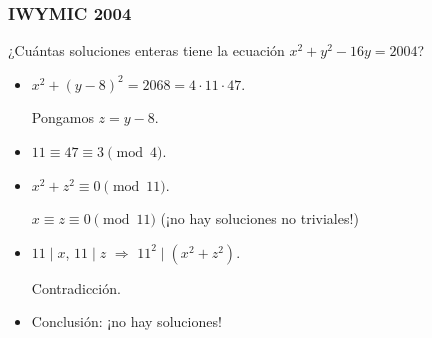 \documentclass[handout]{beamer}
\begin{document}

\begin{frame}[fragile]
  \frametitle{IWYMIC 2004}

  \begin{shaded}
    ¿Cuántas soluciones enteras tiene la ecuación $x^2 + y^2 - 16y = 2004$?
  \end{shaded}

  \vspace{\fill}

  \ifdefined\solutions

  \begin{itemize}
  \item<3-> $x^2 + (y - 8)^2 = 2068 = 4\cdot 11\cdot 47$.

    Pongamos $z = y-8$.

  \item<4-> $11 \equiv 47 \equiv 3 \pmod{4}$.

  \item<5-> $x^2 + z^2 \equiv 0 \pmod{11}$.

    $x \equiv z \equiv 0 \pmod{11}$ (¡no hay soluciones no triviales!)

  \item<6-> $11 \mid x$, $11 \mid z$ $\Longrightarrow$ $11^2 \mid (x^2 + z^2)$.

    Contradicción.

  \item<7-> Conclusión: ¡no hay soluciones!
  \end{itemize}
  \fi
\end{frame}

\end{document}

